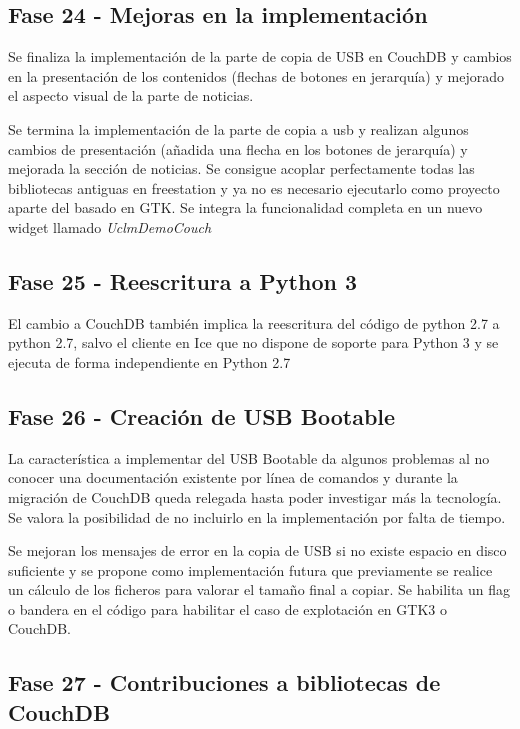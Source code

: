 \subsection{Fase 24 - Mejoras en la implementación}

Se finaliza la implementación de la parte de copia de USB en CouchDB y cambios
en la presentación de los contenidos (flechas de botones en jerarquía) y
mejorado el aspecto visual de la parte de noticias.

Se termina la implementación de la parte de copia a usb y realizan algunos
cambios de presentación (añadida una flecha en los botones de jerarquía) y 
mejorada la sección de noticias. Se consigue acoplar perfectamente todas las
bibliotecas antiguas en freestation y ya no es necesario ejecutarlo como
proyecto aparte del basado en GTK. Se integra la funcionalidad completa en un
nuevo widget llamado \emph{UclmDemoCouch}

\subsection{Fase 25 - Reescritura a Python 3}

El cambio a CouchDB también implica la reescritura del código de python 2.7 a
python 2.7, salvo el cliente en Ice que no dispone de soporte para Python 3 y se
ejecuta de forma independiente en Python 2.7

\newpage

\subsection{Fase 26 - Creación de USB Bootable}

La característica a implementar del USB Bootable da algunos problemas al no
conocer una documentación existente por línea de comandos y durante la migración
de CouchDB queda relegada hasta poder investigar más la tecnología. Se valora la
posibilidad de no incluirlo en la implementación por falta de tiempo.

Se mejoran los mensajes de error en la copia de USB si no existe espacio en
disco suficiente y se propone como implementación futura que previamente se
realice un cálculo de los ficheros para valorar el tamaño final a copiar. Se
habilita un flag o bandera en el código para habilitar el caso de explotación 
en GTK3 o CouchDB.

\subsection{Fase 27 - Contribuciones a bibliotecas de CouchDB}

